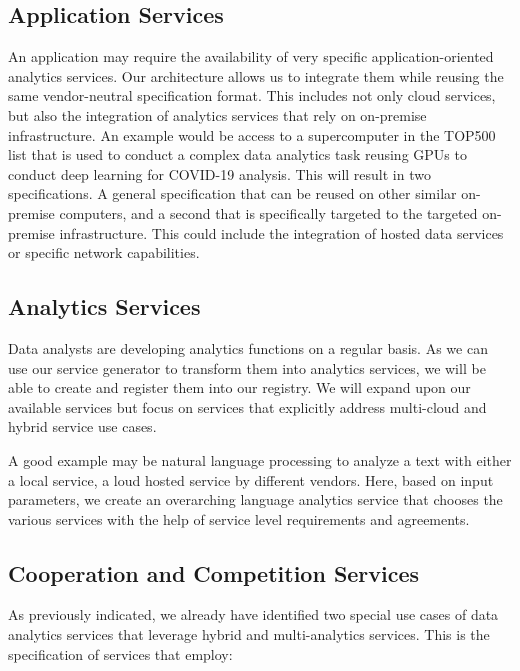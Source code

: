 \subsection{Application Services}

An application may require the availability of very specific
application-oriented analytics services. Our architecture allows us to
integrate them while reusing the same vendor-neutral specification
format. This includes not only cloud services, but also the
integration of analytics services that rely on on-premise
infrastructure. An example would be access to a supercomputer in the
TOP500 list that is used to conduct a complex data analytics task
reusing GPUs to conduct deep learning for COVID-19 analysis.  This
will result in two specifications. A general specification that can be
reused on other similar on-premise computers, and a second that is
specifically targeted to the targeted on-premise infrastructure. This
could include the integration of hosted data services or specific
network capabilities.

\subsection{Analytics Services}

Data analysts are developing analytics functions on a regular
basis. As we can use our service generator to transform them into
analytics services, we will be able to create and register them into
our registry. We will expand upon our available services but focus on
services that explicitly address multi-cloud and hybrid service use
cases.

A good example may be natural language processing to analyze a text
with either a local service, a loud hosted service by different
vendors. Here, based on input parameters, we create an overarching
language analytics service that chooses the various services with the
help of service level requirements and agreements.

\subsection{Cooperation and Competition Services}

As previously indicated, we already have identified two special use
cases of data analytics services that leverage hybrid and
multi-analytics 
services. This is the specification of services that
employ:

